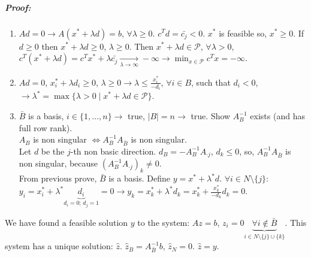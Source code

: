 \documentclass[main]{subfiles}
\begin{document}
\subparagraph{Proof:}
\begin{enumerate}
\item $Ad =0 \rightarrow A(x^* + \lambda d) = b$, $\forall \lambda \geq 0$.
$c^T d = \bar{c_j} < 0$. $x^*$ is feasible so, $x^* \geq 0$. If $d \geq 0$
then $x^* + \lambda d \geq 0$, $\lambda \geq 0$. Then $x^* + \lambda d \in
\mathcal{P}$, $\forall \lambda > 0$, $c^T(x^* + \lambda d) = c^T x^* +
\lambda \bar{c_j} \xrightarrow[\lambda \to \infty]{} -\infty \rightarrow
\displaystyle \min_{x \in \mathcal{P}} c^{T} x = -\infty$.
\item $Ad = 0$, $x^*_i + \lambda d_i \geq 0$, $\lambda \geq 0 \rightarrow
\lambda \leq \frac{x^*_i}{-d_i}$, $\forall i \in B$, such that $d_i < 0$,
$\rightarrow \lambda^* = \max \{ \lambda > 0 \mid x^* + \lambda d
\in \mathcal{P} \}$.
\item $\bar{B}$ is a basis, $i \in \{1, \dots, n\} \rightarrow$ true,
$|B| = n \rightarrow$ true. Show $A^{-1}_B$ exists (and has full row rank).\\
\subitem $A_B$ is non singular $\iff A^{-1}_B A_{\bar{B}}$ is non singular.\\
Let $d$ be the $j$-th non basic direction. $d_B = -A^{-1}_B A_{\cdot j}$,
$d_k \leq 0$, so, $A^{-1}_B A_{\bar{B}}$ is non singular, because
$(A^{-1}_B A_{\cdot j})_k \neq 0$.\\
\subitem From previous prove, $\bar{B}$ is a basis.
Define $y = x^* + \lambda^* d$. $\forall i \in N \setminus \{j\}$:
$y_i = x^*_i + \lambda^* \underbrace{d_i}_{d_i = 0 \text{; } d_j = 1} = 0
\rightarrow y_k = x^*_k + \lambda^* d_k = x^*_k + \frac{x^*_k}{-d_k} d_k = 0$.
\end{enumerate}

We have found a feasible solution $y$ to the system: $Az = b$, $z_i = 0
\underbrace{\forall i \notin \bar{B}}_{i \in N \setminus \{j\} \cup \{k\}}$.
This system has a unique solution: $\hat{z}$. $\hat{z}_B = A^{-1}_{\bar{B}} b$,
$\hat{z}_N = 0$. $\hat{z} = y$.
\end{document}
